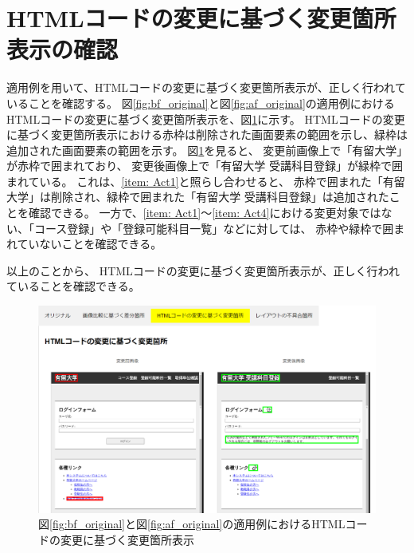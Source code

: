 \section{HTMLコードの変更に基づく変更箇所表示の確認}
適用例を用いて、HTMLコードの変更に基づく変更箇所表示が、正しく行われていることを確認する。
図\ref{fig:bf_original}と図\ref{fig:af_original}の適用例におけるHTMLコードの変更に基づく変更箇所表示を、図\ref{fig: 5_app1}に示す。
HTMLコードの変更に基づく変更箇所表示における赤枠は削除された画面要素の範囲を示し、緑枠は追加された画面要素の範囲を示す。
図\ref{fig: 5_app1}を見ると、
変更前画像上で「有留大学」が赤枠で囲まれており、
変更後画像上で「有留大学 受講科目登録」が緑枠で囲まれている。
これは、\ref{item: Act1}と照らし合わせると、
赤枠で囲まれた「有留大学」は削除され、緑枠で囲まれた「有留大学 受講科目登録」は追加されたことを確認できる。
一方で、\ref{item: Act1}～\ref{item: Act4}における変更対象ではない、「コース登録」や「登録可能科目一覧」などに対しては、
赤枠や緑枠で囲まれていないことを確認できる。
\par
以上のことから、
HTMLコードの変更に基づく変更箇所表示が、正しく行われていることを確認できる。
\begin{figure}[tp]
    \begin{center}
        \includegraphics[width=1.0\columnwidth]{image/5/new_html.png}
        \caption{図\ref{fig:bf_original}と図\ref{fig:af_original}の適用例におけるHTMLコードの変更に基づく変更箇所表示}
        \label{fig: 5_app1}
    \end{center}
\end{figure}

